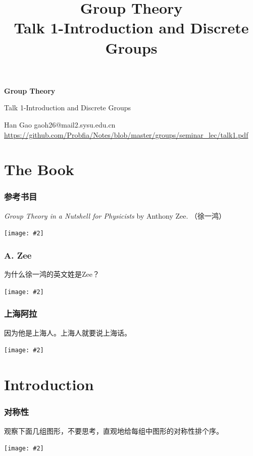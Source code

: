 \documentclass[CJK]{beamer}
\title{Group Theory\\ Talk 1-Introduction and Discrete Groups}
\author{}
\date{}
\newcommand{\cpic}[2]{
\begin{center}
\texttt{[image: \#2]}
\end{center}
}
\begin{document}
\begin{frame}
 
\begin{center}
\begin{Large}
\bch
{\bf Group Theory}

{\vskip 0.3in}

Talk 1-Introduction and Discrete Groups

\ech
\end{Large}
\end{center}

\vskip 0.2in
\begin{center}
Han Gao
\vskip 0.1in
gaoh26@mail2.sysu.edu.cn
\vskip 0.2in
{\tiny \url{https://github.com/Probfia/Notes/blob/master/groups/seminar_lec/talk1.pdf} }\\
\end{center}


\end{frame}

\section{The Book}
\begin{frame}
\frametitle{\bch 参考书目 \ech}
\bch
\emph{Group Theory in a Nutshell for Physicists} by Anthony Zee. （徐一鸿）
\cpic{0.2}{book}
\ech
\end{frame}

\begin{frame}
\frametitle{\bch A. Zee \ech}
\bch
为什么徐一鸿的英文姓是Zee？
\cpic{0.3}{az.jpg}
\ech
\end{frame}

\begin{frame}
\frametitle{\bch 上海阿拉 \ech}
\bch
因为他是上海人。上海人就要说上海话。
\cpic{0.06}{zikawei}
\ech
\end{frame}

\section{Introduction}
\begin{frame}
\frametitle{\bch 对称性 \ech}
\bch
观察下面几组图形，不要思考，直观地给每组中图形的对称性排个序。
\cpic{0.2}{sym1}

\ech
\end{frame}
\end{document}
